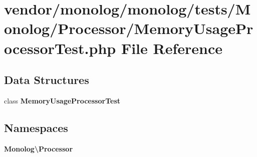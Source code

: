 \section{vendor/monolog/monolog/tests/\+Monolog/\+Processor/\+Memory\+Usage\+Processor\+Test.php File Reference}
\label{_memory_usage_processor_test_8php}
\subsection*{Data Structures}
\begin{DoxyCompactItemize}
\item 
class {\bf Memory\+Usage\+Processor\+Test}
\end{DoxyCompactItemize}
\subsection*{Namespaces}
\begin{DoxyCompactItemize}
\item 
 {\bf Monolog\textbackslash{}\+Processor}
\end{DoxyCompactItemize}
